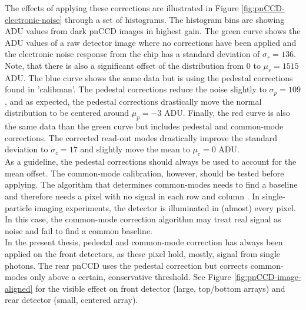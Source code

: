 %
The effects of applying these corrections are illustrated in Figure \ref{fig:pnCCD-electronic-noise} through a set of histograms. The histogram bins are showing ADU values from dark pnCCD images in highest gain. The green curve shows the ADU values of a raw detector image where no corrections have been applied and the electronic noise response from the chip has a standard deviation of $\sigma_{r}=136$. Note, that there is also a significant offset of the distribution from 0 to $\mu_{r}=1515$ ADU. The blue curve shows the same data but is using the pedestal corrections found in 'calibman'. The pedestal corrections reduce the noise slightly to $\sigma_{p}=109$, and as expected, the pedestal corrections drastically move the normal distribution to be centered around $\mu_{p}=-3$ ADU. Finally, the red curve is also the same data than the green curve but includes pedestal and common-mode corrections. The corrected read-out modes drastically improve the standard deviation to $\sigma_{c}=17$ and slightly move the mean to $\mu_{c}=0$ ADU.\\[1\baselineskip]
%
As a guideline, the pedestal corrections should always be used to account for the mean offset. The common-mode calibration, however, should be tested before applying. The algorithm that determines common-modes needs to find a baseline and therefore needs a pixel with no signal in each row and column  \citep{Hantke-Foucard-2016-PC}. In single-particle imaging experiments, the detector is illuminated in (almost) every pixel. In this case, the common-mode correction algorithm may treat real signal as noise and fail to find a common baseline.\\[1\baselineskip]
%
In the present thesis, pedestal and common-mode correction has always been applied on the front detectors, as these pixel hold, mostly, signal from single photons. The rear pnCCD uses the pedestal correction but corrects common-modes only above a certain, conservative threshold. See Figure \ref{fig:pnCCD-image-aligned} for the visible effect on front detector (large, top/bottom arrays) and rear detector (small, centered array).\\
%
%
%
%
%
%
